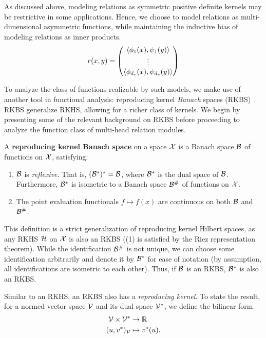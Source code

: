 As discussed above, modeling relations as symmetric positive definite kernels may be restrictive in some applications. Hence, we choose to model relations as multi-dimensional asymmetric functions, while maintaining the inductive bias of modeling relations as inner products.
\begin{equation*}
    r(x,y) = \begin{pmatrix} \left \langle \phi_1(x), \psi_1(y) \right\rangle \\ \vdots \\ \left \langle \phi_{d_r}(x), \psi_{d_r}(y) \right\rangle\end{pmatrix}
\end{equation*}

To analyze the class of functions realizable by such models, we make use of another tool in functional analysis: reproducing kernel \textit{Banach} spaces (RKBS) \parencite{zhangReproducingKernel2009}. RKBS generalize RKHS, allowing for a richer class of kernels. We begin by presenting some of the relevant background on RKBS before proceeding to analyze the function class of multi-head relation modules.

\begin{definition}
    A \textbf{reproducing kernel Banach space} on a space ${\mathcal{X}}$ is a Banach space ${\mathcal{B}}$ of functions on ${\mathcal{X}}$, satisfying:
    \begin{enumerate}
        \item ${\mathcal{B}}$ is \textit{reflexive}. That is, $({\mathcal{B}}^*)^* = {\mathcal{B}}$, where ${\mathcal{B}}^*$ is the dual space of ${\mathcal{B}}$. Furthermore, ${\mathcal{B}}^*$ is isometric to a Banach space ${\mathcal{B}}^\#$ of functions on ${\mathcal{X}}$.
        \item The point evaluation functionals $f \mapsto f(x)$ are continuous on both ${\mathcal{B}}$ and ${\mathcal{B}}^\#$.
    \end{enumerate}
\end{definition}

This definition is a strict generalization of reproducing kernel Hilbert spaces, as any RKHS ${\mathcal{H}}$ on ${\mathcal{X}}$ is also an RKBS ((1) is satisfied by the Riez representation theorem). While the identification ${\mathcal{B}}^\#$ is not unique, we can choose some identification arbitrarily and denote it by ${\mathcal{B}}^*$ for ease of notation (by assumption, all identifications are isometric to each other). Thus, if ${\mathcal{B}}$ is an RKBS, ${\mathcal{B}}^*$ is also an RKBS.

Similar to an RKHS, an RKBS also has a \textit{reproducing kernel}. To state the result, for a normed vector space ${\mathcal{V}}$ and its dual space ${\mathcal{V}}^*$, we define the bilinear form
\begin{equation}\label{eq:bilinear_form}
    \begin{split}
        {\mathcal{V}} \times {\mathcal{V}}^* &\to \mathbb{R}\\
        (u, v^*)_{\mathcal{V}} &\mapsto v^*(u).
    \end{split}
\end{equation}

